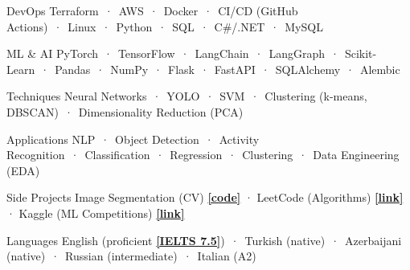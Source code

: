 
\begin{cvskills}

  \cvskill
    {DevOps} %
    {Terraform~·~AWS~·~Docker~·~CI/CD (GitHub Actions)~·~Linux~·~Python~·~SQL~·~C\#/.NET~·~MySQL} %

  \cvskill
    {ML \& AI} %
    {PyTorch~·~TensorFlow~·~LangChain~·~LangGraph~·~Scikit-Learn~·~Pandas~·~NumPy~·~Flask~·~FastAPI~·~SQLAlchemy~·~Alembic} %

  \cvskill
    {Techniques} %
    {Neural Networks~·~YOLO~·~SVM~·~Clustering (k-means, DBSCAN)~·~Dimensionality Reduction (PCA)} %
    
  \cvskill
    {Applications} %
    {NLP~·~Object Detection~·~Activity Recognition~·~Classification~·~Regression~·~Clustering~·~Data Engineering (EDA)} %
    
  \cvskill
    {Side Projects} %
    {Image Segmentation (CV) \href{https://github.com/enverbashirov/Image-Segmentation-Superpixels}{\textbf{[code]}} · LeetCode (Algorithms) \href{https://leetcode.com/enverbashirov/}{\textbf{[link]}} · Kaggle (ML Competitions) \href{https://www.kaggle.com/enverbashirov}{\textbf{[link]}}} %

  \hline
  
  \cvskill
    {Languages} %
    {English (proficient \href{https://github.com/enverbashirov/Resume-Enver-Bashirov/blob/main/certificates/ielts_2016.pdf}{\textbf{[IELTS 7.5]}})~·~Turkish (native)~·~Azerbaijani (native)~·~Russian (intermediate)~·~Italian (A2)} %

\end{cvskills}
